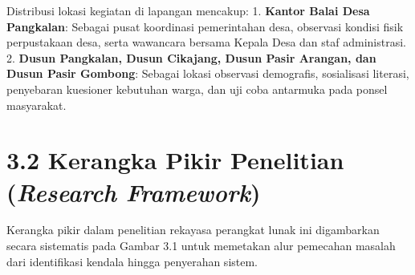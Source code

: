 \documentclass[
  indonesian,
  12pt,
]{report}
\begin{document}
Distribusi lokasi kegiatan di lapangan mencakup: 1. \textbf{Kantor Balai
Desa Pangkalan}: Sebagai pusat koordinasi pemerintahan desa, observasi
kondisi fisik perpustakaan desa, serta wawancara bersama Kepala Desa dan
staf administrasi. 2. \textbf{Dusun Pangkalan, Dusun Cikajang, Dusun
Pasir Arangan, dan Dusun Pasir Gombong}: Sebagai lokasi observasi
demografis, sosialisasi literasi, penyebaran kuesioner kebutuhan warga,
dan uji coba antarmuka pada ponsel masyarakat.

\section{\texorpdfstring{3.2 Kerangka Pikir Penelitian (\emph{Research
Framework})}{3.2 Kerangka Pikir Penelitian (Research Framework)}}\label{kerangka-pikir-penelitian-research-framework}

Kerangka pikir dalam penelitian rekayasa perangkat lunak ini digambarkan
secara sistematis pada Gambar 3.1 untuk memetakan alur pemecahan masalah
dari identifikasi kendala hingga penyerahan sistem.
\end{document}
